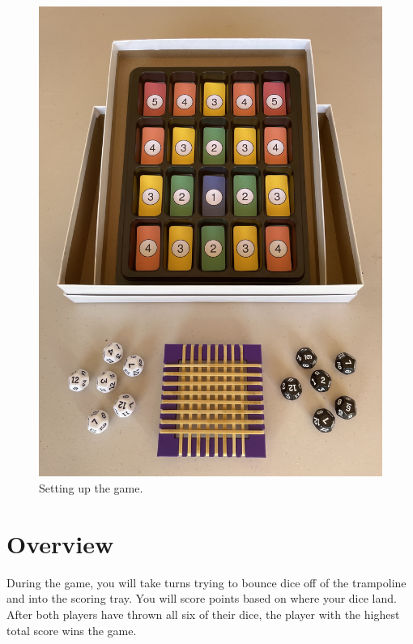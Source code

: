 \documentclass[parskip=half]{scrartcl}
\begin{document}
\newpage

\begin{figure}
\includegraphics[width=\textwidth]{set_up_photo.jpg}
\bigskip
\caption{Setting up the game.}\label{figure:setup}
\end{figure}

\section*{Overview}
During the game, you will take turns trying to bounce dice off of the trampoline and into the scoring tray. You will score points based on where your dice land. After both players have thrown all six of their dice, the player with the highest total score wins the game.
\end{document}
